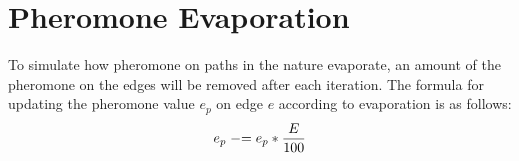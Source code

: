 \section{Pheromone Evaporation}
\label{sec:evaporation}
To simulate how pheromone on paths in the nature evaporate, an amount of the pheromone on the edges will be removed after each iteration.
The formula for updating the pheromone value $e_p$ on edge $e$ according to evaporation is as follows: 
\newline
$$e_p \mathrel{-}= e_p*\frac{E}{100}$$
\newline


